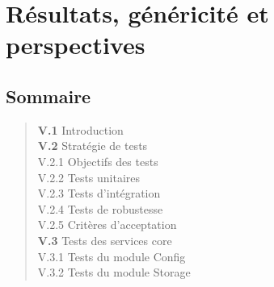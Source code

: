 \chapter{Résultats, généricité et perspectives}

\section*{Sommaire}
\begin{quote}
\small
\textbf{V.1} \hspace{1em} Introduction \dotfill \pageref{sec:intro_ch5}\\
\textbf{V.2} \hspace{1em} Stratégie de tests \dotfill \pageref{sec:test_strat}\\
\hspace{2.5em} V.2.1 \hspace{0.5em} Objectifs des tests \dotfill \pageref{subsec:test_obj}\\
\hspace{2.5em} V.2.2 \hspace{0.5em} Tests unitaires \dotfill \pageref{subsec:unit}\\
\hspace{2.5em} V.2.3 \hspace{0.5em} Tests d'intégration \dotfill \pageref{subsec:integ}\\
\hspace{2.5em} V.2.4 \hspace{0.5em} Tests de robustesse \dotfill \pageref{subsec:robust}\\
\hspace{2.5em} V.2.5 \hspace{0.5em} Critères d'acceptation \dotfill \pageref{subsec:accept}\\
\textbf{V.3} \hspace{1em} Tests des services core \dotfill \pageref{sec:core_tests}\\
\hspace{2.5em} V.3.1 \hspace{0.5em} Tests du module Config \dotfill \pageref{subsec:t_config}\\
\hspace{2.5em} V.3.2 \hspace{0.5em} Tests du module Storage \dotfill \pageref{subsec:t_storage}\\

\end{quote}
